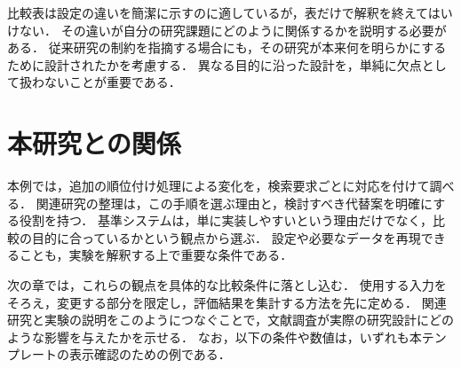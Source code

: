 比較表は設定の違いを簡潔に示すのに適しているが，表だけで解釈を終えてはいけない．
その違いが自分の研究課題にどのように関係するかを説明する必要がある．
従来研究の制約を指摘する場合にも，その研究が本来何を明らかにするために設計されたかを考慮する．
異なる目的に沿った設計を，単純に欠点として扱わないことが重要である．

\section{本研究との関係}
本例では，追加の順位付け処理による変化を，検索要求ごとに対応を付けて調べる．
関連研究の整理は，この手順を選ぶ理由と，検討すべき代替案を明確にする役割を持つ．
基準システムは，単に実装しやすいという理由だけでなく，比較の目的に合っているかという観点から選ぶ．
設定や必要なデータを再現できることも，実験を解釈する上で重要な条件である．

次の章では，これらの観点を具体的な比較条件に落とし込む．
使用する入力をそろえ，変更する部分を限定し，評価結果を集計する方法を先に定める．
関連研究と実験の説明をこのようにつなぐことで，文献調査が実際の研究設計にどのような影響を与えたかを示せる．
なお，以下の条件や数値は，いずれも本テンプレートの表示確認のための例である．
